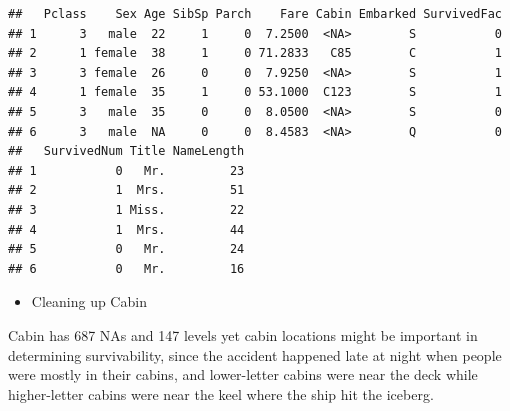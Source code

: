 \documentclass[]{article}
\newenvironment{Shaded}{\begin{snugshade}}{\end{snugshade}}
\newcommand{\KeywordTok}[1]{\textcolor[rgb]{0.13,0.29,0.53}{\textbf{#1}}}
\newcommand{\DecValTok}[1]{\textcolor[rgb]{0.00,0.00,0.81}{#1}}
\newcommand{\CharTok}[1]{\textcolor[rgb]{0.31,0.60,0.02}{#1}}
\newcommand{\StringTok}[1]{\textcolor[rgb]{0.31,0.60,0.02}{#1}}
\newcommand{\CommentTok}[1]{\textcolor[rgb]{0.56,0.35,0.01}{\textit{#1}}}
\newcommand{\ControlFlowTok}[1]{\textcolor[rgb]{0.13,0.29,0.53}{\textbf{#1}}}
\newcommand{\OperatorTok}[1]{\textcolor[rgb]{0.81,0.36,0.00}{\textbf{#1}}}
\newcommand{\NormalTok}[1]{#1}
\providecommand{\tightlist}{%
  \setlength{\itemsep}{0pt}\setlength{\parskip}{0pt}}
\begin{document}
\begin{verbatim}
##   Pclass    Sex Age SibSp Parch    Fare Cabin Embarked SurvivedFac
## 1      3   male  22     1     0  7.2500  <NA>        S           0
## 2      1 female  38     1     0 71.2833   C85        C           1
## 3      3 female  26     0     0  7.9250  <NA>        S           1
## 4      1 female  35     1     0 53.1000  C123        S           1
## 5      3   male  35     0     0  8.0500  <NA>        S           0
## 6      3   male  NA     0     0  8.4583  <NA>        Q           0
##   SurvivedNum Title NameLength
## 1           0   Mr.         23
## 2           1  Mrs.         51
## 3           1 Miss.         22
## 4           1  Mrs.         44
## 5           0   Mr.         24
## 6           0   Mr.         16
\end{verbatim}

\begin{itemize}
\tightlist
\item
  Cleaning up Cabin
\end{itemize}

Cabin has 687 NAs and 147 levels yet cabin locations might be important
in determining survivability, since the accident happened late at night
when people were mostly in their cabins, and lower-letter cabins were
near the deck while higher-letter cabins were near the keel where the
ship hit the iceberg.

\begin{Shaded}
\end{Shaded}
\end{document}
